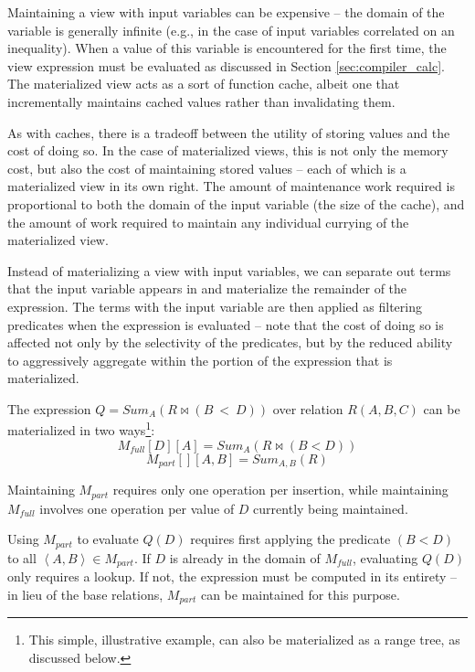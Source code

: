 Maintaining a view with input variables can be expensive -- the domain of the variable is generally infinite (e.g., in the case of input variables correlated on an inequality).  When a value of this variable is encountered for the first time, the view expression must be evaluated as discussed in Section \ref{sec:compiler_calc}.  The materialized view acts as a sort of function cache, albeit one that incrementally maintains cached values rather than invalidating them.

As with caches, there is a tradeoff between the utility of storing values and the cost of doing so.  In the case of materialized views, this is not only the memory cost, but also the cost of maintaining stored values -- each of which is a materialized view in its own right.  The amount of maintenance work required is proportional to both the domain of the input variable (the size of the cache), and the amount of work required to maintain any individual currying of the materialized view.  

Instead of materializing a view with input variables, we can separate out terms that the input variable appears in and materialize the remainder of the expression.  The terms with the input variable are then applied as filtering predicates when the expression is evaluated -- note that the cost of doing so is  affected not only by the selectivity of the predicates, but by the reduced ability to aggressively aggregate within the portion of the expression that is materialized.

\begin{example}
The expression $Q = Sum_A(R \bowtie (B~<~D))$ over relation $R(A,B,C)$ can be materialized in two ways\footnote{This simple, illustrative example, can also be materialized as a range tree, as discussed below.}:
$$M_{full}[D][A] = Sum_A(R \bowtie (B < D))$$
$$M_{part}[][A,B] = Sum_{A,B}(R)$$
\end{example}

Maintaining $M_{part}$ requires only one operation per insertion, while maintaining $M_{full}$ involves one operation per value of $D$ currently being maintained.  

Using $M_{part}$ to evaluate $Q(D)$ requires first applying the predicate $(B < D)$ to all $\left<A,B\right> \in M_{part}$.  If $D$ is already in the domain of $M_{full}$, evaluating $Q(D)$ only requires a lookup.  If not, the expression must be computed in its entirety -- in lieu of the base relations, $M_{part}$ can be maintained for this purpose.

